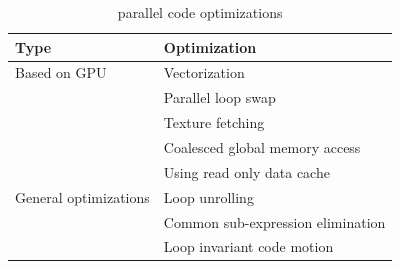 \documentclass[10pt,conference]{IEEEtran}
\begin{document}
\begin{table}[b]
  \centering
  \caption{parallel code optimizations}
  \begin{tabular}{ll}
    \hline
    Type                & Optimization      \\
    \hline
    Based on GPU      & Vectorization        \\
                      & Parallel loop swap   \\
                      & Texture fetching     \\
                      & Coalesced global memory access    \\
                      & Using read only data cache         \\
    General optimizations
                      & Loop unrolling     \\
                      &Common sub-expression elimination\\
                      &Loop invariant code motion\\
    \hline
  \end{tabular}
  \label{parallel_code_optimizations}
\end{table}
\end{document}
